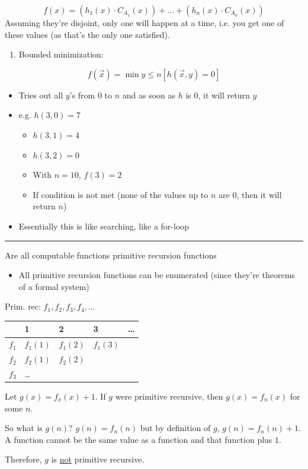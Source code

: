 \documentclass[11pt]{article}
\begin{document}
$$f(x)=(h_1(x)\cdot C_{A_1}(x))+\ldots+(h_n(x)\cdot C_{A_n}(x))$$
Assuming they're disjoint, only one will happen at a time, i.e. you get one of these values (as that's the only one satisfied).
\begin{enumerate}
\item Bounded minimization:
\end{enumerate}
$$f(\vec{x})=\min y\leq n[h(\vec{x},y)=0]$$
\begin{itemize}
\item Tries out all \(y\)'s from \(0\) to \(n\) and as soon as \(h\) is \(0\), it will return \(y\)
\item e.g. \(h(3,0)=7\)
\begin{itemize}
\item \(h(3,1)=4\)
\item \(h(3,2)=0\)
\item With \(n=10\), \(f(3)=2\)
\item If condition is not met (none of the values up to \(n\) are \(0\), then it will return \(n\))
\end{itemize}
\item Essentially this is like searching, like a for-loop
\end{itemize}

\noindent\rule{\textwidth}{0.5pt}
Are all computable functions primitive recursion functions
\begin{itemize}
\item All primitive recursion functions can be enumerated (since they're theorems of a formal system)
\end{itemize}
Prim. rec: \(f_1,f_2,f_3,f_4,\ldots\)
\begin{center}
\begin{tabular}{lllll}
 & 1 & 2 & 3 & \ldots\\
\hline
\(f_1\) & \(f_1(1)\) & \(f_1(2)\) & \(f_1(3)\) & \\
\(f_2\) & \(f_2(1)\) & \(f_2(2)\) &  & \\
\(f_3\) & \ldots &  &  & \\
\end{tabular}
\end{center}
Let \(g(x)=f_x(x)+1\). If \(g\) were primitive recursive, then \(g(x)=f_n(x)\) for some \(n\).

So what is \(g(n)\)? \(g(n)=f_n(n)\) but by definition of \(g\), \(g(n)=f_n(n)+1\). A function cannot be the same value as a function and that function plus \(1\). \lightning

Therefore, \(g\) is \uline{not} primitive recursive. 
\end{document}

